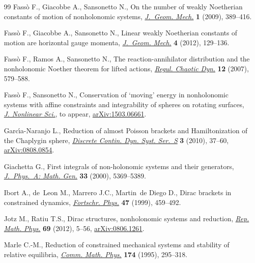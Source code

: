 \begin{thebibliography}{99}
Fass{\`o} F., Giacobbe A., Sansonetto N., On the number of weakly {N}oetherian
  constants of motion of nonholonomic systems, \href{http://dx.doi.org/10.3934/jgm.2009.1.389}{\textit{J.~Geom. Mech.}}
  \textbf{1} (2009), 389--416.

Fass{\`o} F., Giacobbe A., Sansonetto N., Linear weakly {N}oetherian constants
  of motion are horizontal gauge momenta, \href{http://dx.doi.org/10.3934/jgm.2012.4.129}{\textit{J.~Geom. Mech.}} \textbf{4}
  (2012), 129--136.

Fass{\`o} F., Ramos A., Sansonetto N., The reaction-annihilator distribution
  and the nonholonomic {N}oether theorem for lifted actions, \href{http://dx.doi.org/10.1134/S1560354707060019}{\textit{Regul.
  Chaotic Dyn.}} \textbf{12} (2007), 579--588.

Fass{\`o} F., Sansonetto N., Conservation of `moving' energy in nonholonomic
  systems with af\/f\/ine constraints and integrability of spheres on rotating
  surfaces, \href{http://dx.doi.org/10.1007/s00332-015-9283-4}{\textit{J. Nonlinear Sci.}}, {t}o appear, \href{http://arxiv.org/abs/1503.06661}{arXiv:1503.06661}.

Garc{\'{\i}}a-Naranjo L., Reduction of almost {P}oisson brackets and
  {H}amiltonization of the {C}haplygin sphere, \href{http://dx.doi.org/10.3934/dcdss.2010.3.37}{\textit{Discrete Contin. Dyn.
  Syst. Ser.~S}} \textbf{3} (2010), 37--60, \href{http://arxiv.org/abs/0808.0854}{arXiv:0808.0854}.

Giachetta G., First integrals of non-holonomic systems and their generators,
  \href{http://dx.doi.org/10.1088/0305-4470/33/30/308}{\textit{J.~Phys.~A: Math. Gen.}} \textbf{33} (2000), 5369--5389.

Ibort A., de~Leon M., Marrero J.C., Martin~de Diego D., Dirac brackets in
  constrained dynamics, \href{http://dx.doi.org/10.1002/(SICI)1521-3978(199906)47:5<459::AID-PROP459>3.0.CO;2-E}{\textit{Fortschr. Phys.}} \textbf{47} (1999), 459--492.

Jotz M., Ratiu T.S., Dirac structures, nonholonomic systems and reduction,
  \href{http://dx.doi.org/10.1016/S0034-4877(12)60016-0}{\textit{Rep. Math. Phys.}} \textbf{69} (2012), 5--56, \href{http://arxiv.org/abs/0806.1261}{arXiv:0806.1261}.

Marle C.-M., Reduction of constrained mechanical systems and stability of
  relative equilibria, \href{http://dx.doi.org/10.1007/BF02099604}{\textit{Comm. Math. Phys.}} \textbf{174} (1995),
  295--318.


\end{thebibliography}
